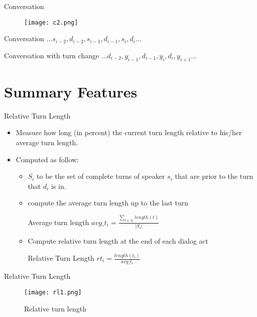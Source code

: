 \documentclass[t]{beamer}
\begin{document}
\begin{frame}{Conversation}

\begin{figure}
 \centering
 \texttt{[image: c2.png]}
 \end{figure}

  \begin{block}{Conversation}
    { $\ldots  s_{i-2}, d_{i-2}, s_{i-1} , d_{i-1}, s_i, d_i  \ldots$  }
  \end{block}
  \begin{block}{Conversation with turn change}
     $\ldots d_{i-2}, y_{i-1}, d_{i-1}, y_{i} , d_i, y_{i+1}\ldots$
  \end{block}
\end{frame}

\section{Summary Features}

\begin{frame}{Relative Turn Length}
\begin{itemize}
  \item Measure how long (in percent) the current turn length relative to his/her average turn length.
  \item {Computed as follow:
        \begin{itemize}
            \item $S_i$ to be the set of complete turns of speaker $s_i$ that are prior to the turn that $d_i$ is in.
            \item compute the average turn length up to the last turn
                \begin{block}{Average turn length }
                   $avg\_t_i = \frac{\sum_{t \in S_i} length(t)}{|S_i|}$
                \end{block}
            \item Compute relative turn length at the end of each dialog act
                \begin{block}{Relative Turn Length}
                     $rt_i =  \frac{length(t_i)} {avg\_t_i}$
                \end{block}
         \end{itemize}
         }
\end{itemize}
\end{frame}

\begin{frame}{Relative Turn Length}
 \begin{figure}[ht!]
 \centering
 \texttt{[image: rl1.png]}
 \caption{Relative turn length\label{overflow}}
 \end{figure}

\end{frame}
\end{document}
